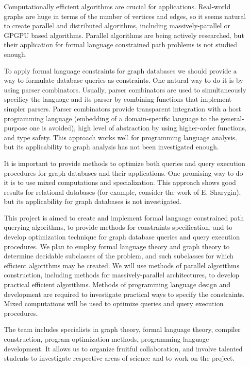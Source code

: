\documentclass[12pt]{article}  %
\theoremstyle{remark}
\begin{document}
Computationally efficient algorithms are crucial for applications.
Real-world graphs are huge in terms of the number of vertices and edges, so it seems natural to create parallel and distributed algorithms, including massively-parallel or GPGPU based algorithms.
Parallel algorithms are being actively researched, but their application for formal language constrained path problems is not studied enough. 

To apply formal language constraints for graph databases we should provide a way to formulate database queries as constraints.
One natural way to do it is by using parser combinators.
Usually, parser combinators are used to simultaneously specificy the language and its parser by combining functions that implement simpler parsers.
Parser combinators provide transparent integration with a host programming language (embedding of a domain-specific language to the general-purpose one is avoided), high level of abstraction by using higher-order functions, and type safety.
This approach works well for programming language analysis, but its applicability to graph analysis has not been investigated enough.

It is important to provide methods to optimize both queries and query execution procedures for graph databases and their applications.
One promising way to do it is to use mixed computations and specialization.
This approach shows good results for relational databases (for example, consider the work of E. Sharygin), but its applicability for graph databases is not investigated.

This project is aimed to create and implement formal language constrained path querying algorithms, to provide methods for constraints specification, and to develop optimization technique for graph database queries and query execution procedures.
We plan to employ formal language theory and graph theory to determine decidable subclasses of the problem, and such subclasses for which efficient algorithms may be created.
We will use methods of parallel algorithms construction, including methods for massively-parallel architectures, to develop practical efficient algorithms.
Methods of programming language design and development are required to investigate practical ways to specify the constraints.
Mixed computations will be used to optimize queries and query execution procedures.

The team includes specialists in graph theory, formal language theory, compiler construction, program optimization methods, programming language development. It allows us to organize fruitful collaboration, and involve talented students to investigate respective areas of science and to work on the project.
\end{document}
